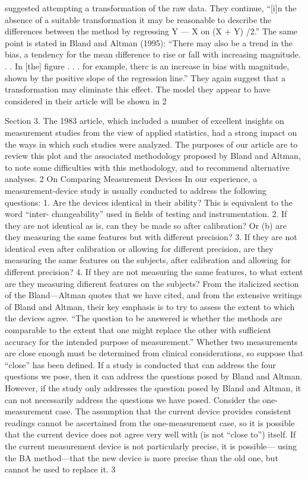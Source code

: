 suggested attempting a transformation of the raw data. They continue, “[i]n the
absence of a suitable transformation it may be reasonable to describe the differences
between the method by regressing Y — X on (X + Y) /2.” The same point is stated
in Bland and Altman (1995): “There may also be a trend in the bias, a tendency
for the mean difference to rise or fall with increasing magnitude. . . In [the] ﬁgure . . .
for example, therc is an increase in bias with magnitude, shown by the positive slope
of the regression line.” They again suggest that a transformation may eliminate this
effect. The model they appear to have considered in their article will be shown in
2



Section 3.
The 1983 article, which included a number of excellent insights on measurement
studies from the view of applied statistics, had a strong impact on the ways in which
such studies were analyzed. The purposes of our article are to review this plot and
the associated methodology proposed by Bland and Altman, to note some difficulties
with this methodology, and to recommend alternative analyses.
2 On Comparing Measurement Devices
In our experience, a measurement-device study is usually conducted to address the
following questions:
1. Are the devices identical in their ability? This is equivalent to the word “inter-
changeability” used in ﬁelds of testing and instrumentation.
2. If they are not identical as is,  can they be made so after calibration? Or (b)
are they measuring the same features but with different precision?
3. If they are not identical even after calibration or allowing for different precision,
are they measuring the same features on the subjects, after calibration and
allowing for different precision?
4. If they are not measuring the same features, to what extent are they measuring
diﬁerent features on the subjects?
From the italicized section of the Bland—Altman quotes that we have cited, and
from the extensive writings of Bland and Altman, their key emphasis is to try to assess
the extent to which the devices agree. “The question to be answered is whether the
methods are comparable to the extent that one might replace the other with sufficient
accuracy for the intended purpose of measurement.”
Whether two measurements are close enough must be determined from clinical
considerations, so suppose that “close” has been deﬁned. If a study is conducted that
can address the four questions we pose, then it can address the questions posed by
Bland and Altman. However, if the study only addresses the question posed by Bland
and Altman, it can not necessarily address the questions we have posed.
Consider the one-measurement case. The assumption that the current device
provides consistent readings cannot be ascertained from the one-measurement case,
so it is possible that the current device does not agree very well with (is not “close to”)
itself. If the current measurement device is not particularly precise, it is possible—
using the BA method—that the new device is more precise than the old one, but
cannot be used to replace it.
3



